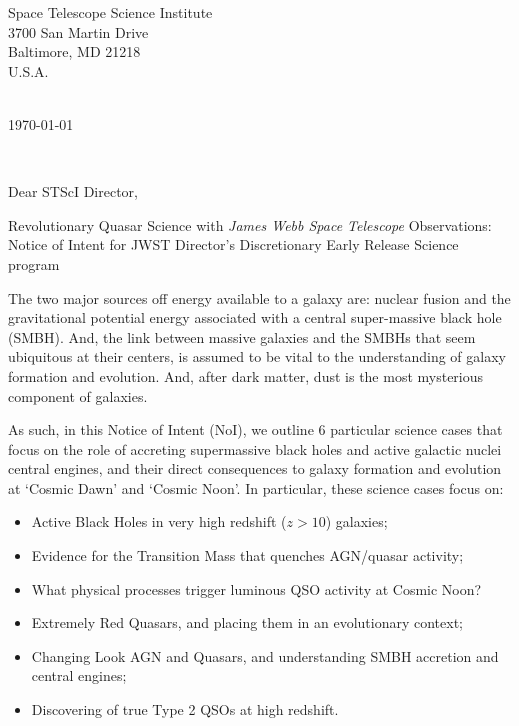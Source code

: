 \documentclass[11pt,a4paper]{letter} %
\def\opening#1{\thispagestyle{empty}
{\centering\fromaddress \vspace{0.6in} \\                  %
\hspace*{\longindentation}\today\hspace*{\fill}\par} %
{\raggedright \toname \\ \toaddress \par}                  %
\vspace{0.4in}                                                              %
\noindent #1                                                               %
}
\begin{document}

\begin{letter}
{Space Telescope Science Institute\\ 
3700 San Martin Drive\\
Baltimore, MD 21218 \\
U.S.A.
}



\opening{Dear STScI Director,}

\smallskip
\begin{center}
{\sc Revolutionary Quasar Science with {\it James Webb Space Telescope} Observations:\\
Notice of Intent for JWST Director's Discretionary Early Release Science program}
\end{center}

The two major sources off energy available to a galaxy are: nuclear
fusion and the gravitational potential energy associated with a
central super-massive black hole (SMBH). And, the link between massive
galaxies and the SMBHs that seem ubiquitous at their centers, is
assumed to be vital to the understanding of galaxy formation and
evolution. And, after dark matter, dust is the most mysterious
component of galaxies.

As such, in this Notice of Intent (NoI), we outline 6 particular
science cases that focus on the role of accreting supermassive black
holes and active galactic nuclei central engines, and their direct
consequences to galaxy formation and evolution at `Cosmic Dawn' and
`Cosmic Noon'.
In particular, these science cases focus on:
\begin{itemize}
\item{Active Black Holes in very high redshift ($z>10$) galaxies;}
\item{Evidence for the Transition Mass that quenches AGN/quasar activity;}
\item{What physical processes trigger luminous QSO activity at Cosmic Noon?}
\item{Extremely Red Quasars, and placing them in an evolutionary context;}
\item{Changing Look AGN and Quasars, and understanding SMBH accretion and central engines;} 
\item{Discovering of true Type 2 QSOs at high redshift.}
\end{itemize}


\end{letter}
\end{document}

